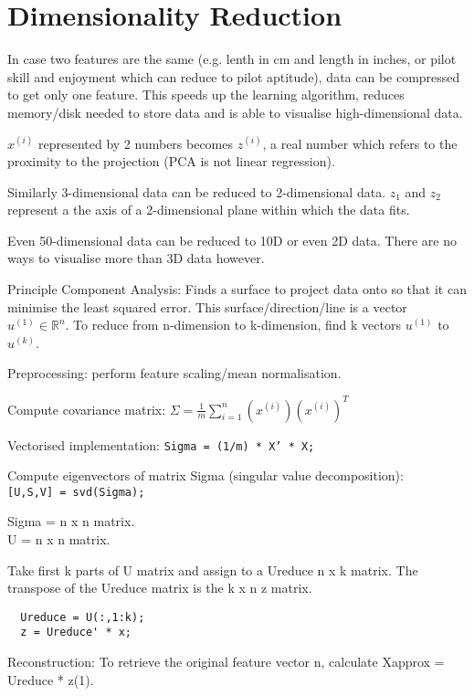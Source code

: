 \documentclass[12pt] {article}
\begin{document}
{  \newpage

\section{Dimensionality Reduction}

  In case two features are the same (e.g. lenth in cm and length in inches, or
  pilot skill and enjoyment which can reduce to pilot aptitude), data
  can be compressed to get only one feature. This speeds up the learning
  algorithm, reduces memory/disk needed to store data and is able to 
  visualise high-dimensional data.  

  $x^{(i)}$ represented by 2 numbers becomes $z^{(i)}$, a real number which 
  refers to the proximity to the projection (PCA is not linear regression). 

  Similarly 3-dimensional data can be reduced to 2-dimensional data. $z_1$ and
  $z_2$ represent a the axis of a 2-dimensional plane within which the data fits.  

  Even 50-dimensional data can be reduced to 10D or even 2D data. There are no 
  ways to visualise more than 3D data however. 
  
  Principle Component Analysis: Finds a surface to project data onto so that it
  can minimise the least squared error. This surface/direction/line is a vector
  $u^{(1)}\in\mathbb{R}^n$. To reduce from n-dimension to k-dimension, find k 
  vectors $u^{(1)}$ to $u^{(k)}$. 

  Preprocessing: perform feature scaling/mean normalisation.

  Compute covariance matrix: $\Sigma = \frac{1}{m} \displaystyle\sum_{i=1}^n 
  (x^{(i)})(x^{(i)})^T$

  Vectorised implementation: \texttt{Sigma = (1/m) * X' * X;}

  Compute eigenvectors of matrix Sigma (singular value decomposition):\\ 
  \texttt{[U,S,V] = svd(Sigma);}

  Sigma = n x n matrix.\\
  U = n x n matrix.

  Take first k parts of U matrix and assign to a Ureduce n x k matrix. The 
  transpose of the Ureduce matrix is the k x n z matrix. 

  \begin{lstlisting}
  Ureduce = U(:,1:k); 
  z = Ureduce' * x;
  \end{lstlisting}

  Reconstruction: To retrieve the original feature vector n, calculate
  Xapprox = Ureduce * z(1).

}
\end{document}
